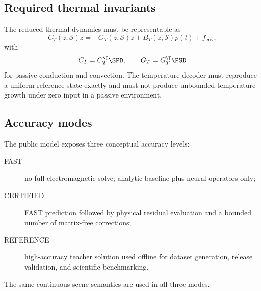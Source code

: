 \subsection{Required thermal invariants}

The reduced thermal dynamics must be representable as
\[
  C_T(z,\mathcal S)\dot z
  =-G_T(z,\mathcal S)z+B_T(z,\mathcal S)p(t)+f_{\mathrm{env}},
\]
with
\[
  C_T=C_T^\T\SPD,\qquad G_T=G_T^\T\PSD
\]
for passive conduction and convection. The temperature decoder must reproduce a
uniform reference state exactly and must not produce unbounded temperature
growth under zero input in a passive environment.

\subsection{Accuracy modes}

The public model exposes three conceptual accuracy levels:
\begin{description}
\item[FAST] no full electromagnetic solve; analytic baseline plus neural
  operators only;
\item[CERTIFIED] FAST prediction followed by physical residual evaluation and a
  bounded number of matrix-free corrections;
\item[REFERENCE] high-accuracy teacher solution used offline for dataset
  generation, release validation, and scientific benchmarking.
\end{description}

The same continuous scene semantics are used in all three modes.
